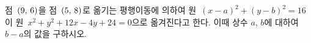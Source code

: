 점~$(9,\mkern3mu 6)$을 점~$(5,\mkern3mu 8)$로 옮기는 평행이동에 의하여 원~$(x-a)^2+(y-b)^2=16$이 원~$x^2+y^2+12x-4y+24=0$으로 옮겨진다고 한다. 이때 상수 $a$, $b$에 대하여 $b-a$의 값을 구하시오.
